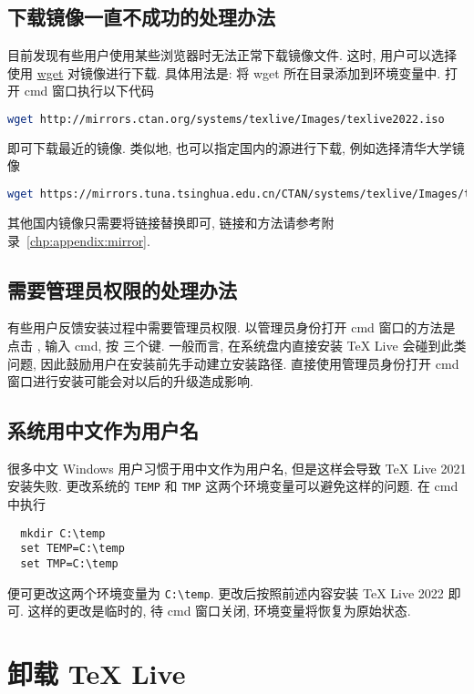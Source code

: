 \subsection{下载镜像一直不成功的处理办法}

目前发现有些用户使用某些浏览器时无法正常下载镜像文件.
这时,
用户可以选择使用 \href{https://eternallybored.org/misc/wget/}{\textsf{wget}} 对镜像进行下载.
具体用法是:
将 \textsf{wget} 所在目录添加到环境变量中.
打开 \textsf{cmd} 窗口执行以下代码
\begin{lstlisting}[language = bash]
  wget http://mirrors.ctan.org/systems/texlive/Images/texlive2022.iso
\end{lstlisting}
即可下载最近的镜像.
类似地,
也可以指定国内的源进行下载,
例如选择清华大学镜像
\begin{lstlisting}[language = bash]
  wget https://mirrors.tuna.tsinghua.edu.cn/CTAN/systems/texlive/Images/texlive2022.iso
\end{lstlisting}
其他国内镜像只需要将链接替换即可,
链接和方法请参考附录~\ref{chp:appendix:mirror}.

\subsection{需要管理员权限的处理办法}

有些用户反馈安装过程中需要管理员权限.
以管理员身份打开 \textsf{cmd} 窗口的方法是点击 \keys{\faWindows},
输入 \textsf{cmd},
按 \keys{\ctrl + \shift + \enter} 三个键.
一般而言,
在系统盘内直接安装 \TeX{} Live 会碰到此类问题,
因此鼓励用户在安装前先手动建立安装路径.
直接使用管理员身份打开 \textsf{cmd} 窗口进行安装可能会对以后的升级造成影响.

\subsection{系统用中文作为用户名}\label{sec:chinesename}

很多中文 Windows 用户习惯于用中文作为用户名,
但是这样会导致 \TeX{} Live 2021 安装失败.
更改系统的 \texttt{TEMP} 和 \texttt{TMP} 这两个环境变量可以避免这样的问题.
在 \textsf{cmd} 中执行
\begin{lstlisting}
  mkdir C:\temp
  set TEMP=C:\temp
  set TMP=C:\temp
\end{lstlisting}
便可更改这两个环境变量为 \texttt{C:\textbackslash temp}.
更改后按照前述内容安装 \TeX{} Live 2022 即可.
这样的更改是临时的,
待 \textsf{cmd} 窗口关闭,
环境变量将恢复为原始状态.

\section{卸载 \TeX{} Live}

